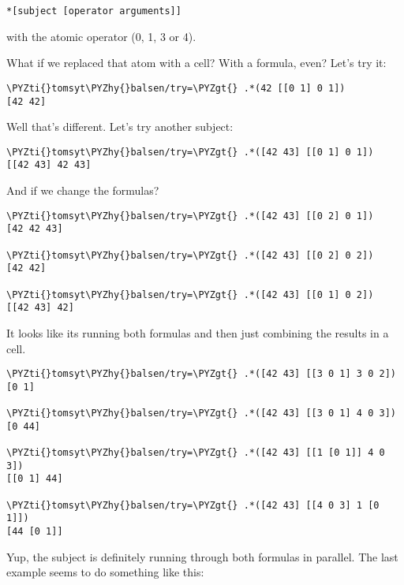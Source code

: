 \begin{framed_shaded}
\begin{Verbatim}[fontsize=\relsize{-2.5},fontseries=b,commandchars=\\\{\}]
*[subject [operator arguments]]
\end{Verbatim}
\end{framed_shaded}
with the atomic operator (0, 1, 3 or 4).

What if we replaced that atom with a cell? With a formula, even? Let's try it:

\begin{framed_shaded}
\begin{Verbatim}[fontsize=\relsize{-2.5},fontseries=b,commandchars=\\\{\}]
\PYZti{}tomsyt\PYZhy{}balsen/try=\PYZgt{} .*(42 [[0 1] 0 1])
[42 42]
\end{Verbatim}
\end{framed_shaded}
Well that's different. Let's try another subject:

\begin{framed_shaded}
\begin{Verbatim}[fontsize=\relsize{-2.5},fontseries=b,commandchars=\\\{\}]
\PYZti{}tomsyt\PYZhy{}balsen/try=\PYZgt{} .*([42 43] [[0 1] 0 1])
[[42 43] 42 43]
\end{Verbatim}
\end{framed_shaded}
And if we change the formulas?

\begin{framed_shaded}
\begin{Verbatim}[fontsize=\relsize{-2.5},fontseries=b,commandchars=\\\{\}]
\PYZti{}tomsyt\PYZhy{}balsen/try=\PYZgt{} .*([42 43] [[0 2] 0 1])
[42 42 43]

\PYZti{}tomsyt\PYZhy{}balsen/try=\PYZgt{} .*([42 43] [[0 2] 0 2])
[42 42]

\PYZti{}tomsyt\PYZhy{}balsen/try=\PYZgt{} .*([42 43] [[0 1] 0 2])
[[42 43] 42]
\end{Verbatim}
\end{framed_shaded}
It looks like its running both formulas and then just combining the results in a cell.

\begin{framed_shaded}
\begin{Verbatim}[fontsize=\relsize{-2.5},fontseries=b,commandchars=\\\{\}]
\PYZti{}tomsyt\PYZhy{}balsen/try=\PYZgt{} .*([42 43] [[3 0 1] 3 0 2])
[0 1]

\PYZti{}tomsyt\PYZhy{}balsen/try=\PYZgt{} .*([42 43] [[3 0 1] 4 0 3])
[0 44]

\PYZti{}tomsyt\PYZhy{}balsen/try=\PYZgt{} .*([42 43] [[1 [0 1]] 4 0 3])
[[0 1] 44]

\PYZti{}tomsyt\PYZhy{}balsen/try=\PYZgt{} .*([42 43] [[4 0 3] 1 [0 1]])
[44 [0 1]]
\end{Verbatim}
\end{framed_shaded}
Yup, the subject is definitely running through both formulas in parallel. The
last example seems to do something like this:

